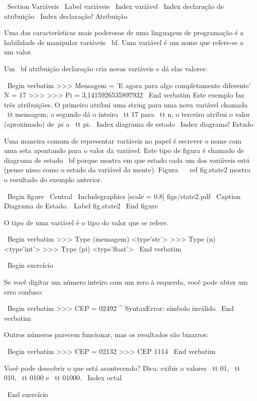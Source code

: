 \documentclass[10pt]{book}
\begin{document}
{\ Section {Variáveis}
\ Label {variáveis}
\ Index {variável}
\ Index {declaração de atribuição}
\ Index {declaração! Atribuição}

Uma das características mais poderosas de uma linguagem de programação é a
habilidade de manipular variáveis ​​{\ bf}. Uma variável é um nome que
refere-se a um valor.

Um {\ bf atribuição declaração} cria novas variáveis ​​e dá
elas valores:

\ Begin {verbatim}
>>> Mensagem = 'E agora para algo completamente diferente'
N = 17 >>>
>>> Pi = 3,1415926535897932
\ End {verbatim}
%
Este exemplo faz três atribuições. O primeiro atribui uma string
para uma nova variável chamada {\ tt mensagem};
o segundo dá o inteiro {\ tt 17} para {\ tt n}, o terceiro
atribui o valor (aproximado) de $ \ pi $ a {\ tt pi}.
\ Index {diagrama de estado}
\ Index {diagrama! Estado}

Uma maneira comum de representar variáveis ​​no papel é escrever o nome com
uma seta apontando para o valor da variável. Este tipo de figura é
chamado de diagrama de estado {\ bf} porque mostra em que estado cada um dos
variáveis ​​está (pense nisso como o estado da variável da mente).
Figura ~ \ ref {fig.state2} mostra o resultado do exemplo anterior.

\ Begin {figure}
\ Central
{\ Includegraphics [scale = 0.8] {figs/state2.pdf}}
\ Caption {Diagrama de Estado.}
\ Label {} fig.state2
\ End {figure}

O tipo de uma variável é o tipo do valor que se refere.

\ Begin {verbatim}
>>> Type (mensagem)
<type'str'>
>>> Type (n)
<type'int'>
>>> Type (pi)
<type'float'>
\ End {verbatim}

\ Begin {} exercício

Se você digitar um número inteiro com um zero à esquerda, você pode obter
um erro confuso:

\ Begin {verbatim}
>>> CEP = 02492
                  ^
SyntaxError: símbolo inválido
\ End {verbatim}

Outros números parecem funcionar, mas os resultados são bizarros:

\ Begin {verbatim}
>>> CEP = 02132
>>> CEP
1114
\ End {verbatim}

Você pode descobrir o que está acontecendo? Dica: exibir o
valores {\ tt 01}, {\ tt 010}, {\ tt 0100} e {\ tt 01000}.
\ Index {octal}

\ End {} exercício



}
\end{document}
